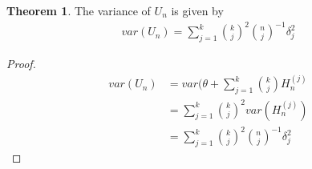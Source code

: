 \documentclass{article}
\theoremstyle{definition}
\newtheorem{theorem}{Theorem}
\numberwithin{Def}{section}
\begin{document}
\begin{itemize}
    \begin{theorem}
    The variance of $U_n$ is given by 
    \begin{align}
        var(U_n) = \sum_{j=1}^k {k \choose j}^2 {n \choose j}^{-1}\delta_j^2
    \end{align}
    \end{theorem}
    \begin{proof}
    \begin{align*}
        var(U_n) &= var(\theta + \sum_{j=1}^k {k \choose j}H_n^{(j)} \\
        &= \sum_{j=1}^k {k \choose j}^2var(H_n^{(j)})\\
        &= \sum_{j=1}^k {k \choose j}^2 {n \choose j}^{-1}\delta_j^2
    \end{align*}
    \end{proof}
\end{itemize}
\end{document}
